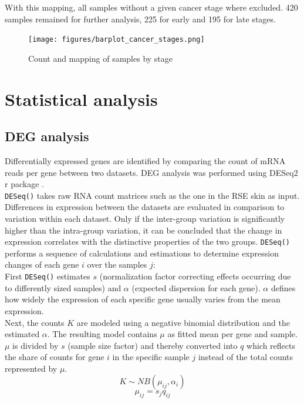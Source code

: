 \documentclass[twoside]{article}
\begin{document}
With this mapping, all samples without a given cancer stage where excluded. 420 samples remained for further analysis, 225 for early and 195 for late stages.

 \begin{figure}[!htb]
     \centering
     \texttt{[image: figures/barplot\_cancer\_stages.png]}
     \caption{Count and mapping of samples by stage}
     \label{fig:my_label}
 \end{figure}


\section{Statistical analysis}
\subsection{DEG analysis}
Differentially expressed genes are identified by comparing the count of mRNA reads per gene between two datasets. DEG analysis was performed using DESeq2 r package \citep{love2014moderated}.\\
\texttt{DESeq()} takes raw RNA count matrices such as the one in the RSE skin as input. Differences in expression between the datasets are evaluated in comparison to variation within each dataset. Only if the inter-group variation is significantly higher than the intra-group variation, it can be concluded that the change in expression correlates with the distinctive properties of the two groups. \texttt{DESeq()} performs a sequence of calculations and estimations to determine expression changes of each gene $i$ over the samples $j$:\\
First \texttt{DESeq()} estimates $s$ (normalization factor correcting effects occurring due to differently sized samples) and $\alpha$ (expected dispersion for each gene). $\alpha$ defines how widely the expression of each specific gene usually  varies from the mean expression.\\
Next, the counts $K$ are modeled using a negative binomial distribution and the estimated $\alpha$. The resulting model contains $\mu$ as fitted mean per gene and sample. $\mu$ is divided by $s$ (sample size factor) and thereby converted into $q$ which reflects the share of counts for gene $i$ in the specific sample $j$ instead of the total counts represented by $\mu$.\\
\begin{equation}
K \sim NB(\mu_{ij}, \alpha_{i})
\end{equation} %
\[\mu_{ij} = s_{j} q_{ij}\]
\end{document}
